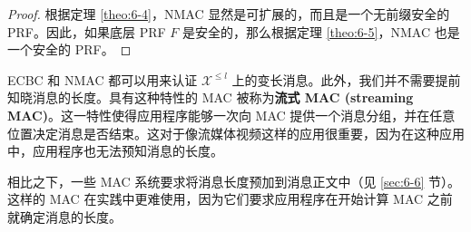 \begin{proof}
根据定理 \ref{theo:6-4}，NMAC 显然是可扩展的，而且是一个无前缀安全的 PRF。因此，如果底层 PRF $F$ 是安全的，那么根据定理 \ref{theo:6-5}，NMAC 也是一个安全的 PRF。
\end{proof}

\begin{snote}
ECBC 和 NMAC 都可以用来认证 $\mathcal{X}^{\leq l}$ 上的变长消息。此外，我们并不需要提前知晓消息的长度。具有这种特性的 MAC 被称为\textbf{流式 MAC (streaming MAC)}。这一特性使得应用程序能够一次向 MAC 提供一个消息分组，并在任意位置决定消息是否结束。这对于像流媒体视频这样的应用很重要，因为在这种应用中，应用程序也无法预知消息的长度。

相比之下，一些 MAC 系统要求将消息长度预加到消息正文中（见 \ref{sec:6-6} 节）。这样的 MAC 在实践中更难使用，因为它们要求应用程序在开始计算 MAC 之前就确定消息的长度。
\end{snote}